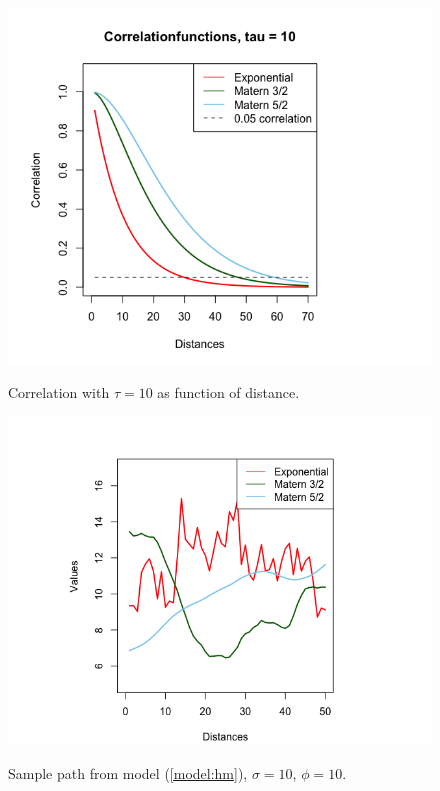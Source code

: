 \begin{figure}[!htb]
\hspace{-30pt}
   \begin{minipage}{0.475\textwidth}
     \centering
     \includegraphics[width=1.3\linewidth]{figurer/correlation_tau10.png}
     \label{fig:data_original}
     \caption{Correlation with $\tau = 10$ as function of distance.}
   \end{minipage}
   \hspace{0.1pt}
   \begin{minipage}{0.475\textwidth}
     \centering
     \includegraphics[width=1.3\linewidth]{figurer/sample_path-sigma10phi10.png}
	 \label{fig:data_original_reduced}
	 \caption{Sample path from model (\ref{model:hm}), $\sigma = 10$, $\phi = 10$.}
	 \end{minipage}
\end{figure}




